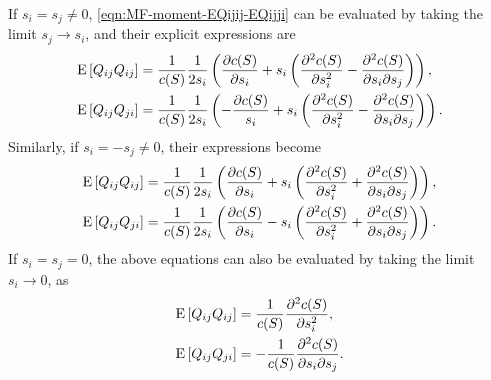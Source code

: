 If $s_i = s_j \neq 0$, \eqref{eqn:MF-moment-EQijij-EQijji} can be evaluated by taking the limit $s_j\to s_i$, and their explicit expressions are
\begin{subequations} \label{eqn:MF-moment-EQijij-EQijji-degenerate1}
	\begin{align}
		\mathrm{E}\left[ Q_{ij}Q_{ij} \right] &= \frac{1}{c(S)}\frac{1}{2s_i} \left( \frac{\partial c(S)}{\partial s_i} + s_i\left( \frac{\partial^2 c(S)}{\partial s_i^2} - \frac{\partial^2 c(S)}{\partial s_i \partial s_j} \right) \right), \\
		\mathrm{E}\left[ Q_{ij}Q_{ji} \right] &= \frac{1}{c(S)}\frac{1}{2s_i}\left( -\frac{\partial c(S)}{s_i} + s_i\left( \frac{\partial^2 c(S)}{\partial s_i^2} - \frac{\partial^2 c(S)}{\partial s_i \partial s_j} \right) \right).
	\end{align}
\end{subequations}
Similarly, if $s_i = -s_j \neq 0$, their expressions become
\begin{subequations}
	\begin{align}
		\mathrm{E}\left[ Q_{ij}Q_{ij} \right] &= \frac{1}{c(S)} \frac{1}{2s_i} \left( \frac{\partial c(S)}{\partial s_i}  + s_i\left( \frac{\partial^2 c(S)}{\partial s_i^2} + \frac{\partial^2 c(S)}{\partial s_i \partial s_j} \right) \right), \\
		\mathrm{E}\left[ Q_{ij}Q_{ji} \right] &= \frac{1}{c(S)} \frac{1}{2s_i} \left( \frac{\partial c(S)}{\partial s_i} - s_i\left( \frac{\partial^2 c(S)}{\partial s_i^2} + \frac{\partial^2 c(S)}{\partial s_i \partial s_j} \right) \right).
	\end{align}
\end{subequations}
If $s_i = s_j = 0$, the above equations can also be evaluated by taking the limit $s_i\to 0$, as
\begin{subequations} \label{eqn:MF-moment-EQijij-EQijji-degenerate3}
	\begin{align}
		\mathrm{E}\left[ Q_{ij}Q_{ij} \right] &= \frac{1}{c(S)} \frac{\partial^2 c(S)}{\partial s_i^2}, \\
		\mathrm{E}\left[ Q_{ij}Q_{ji} \right] &= -\frac{1}{c(S)} \frac{\partial^2 c(S)}{\partial s_i \partial s_j}.
	\end{align}
\end{subequations}

